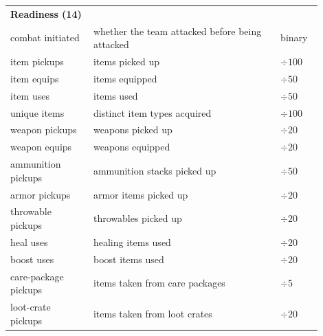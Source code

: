 \begin{table}[t]
\begin{tabular}{p{0.24\linewidth}p{0.54\linewidth}p{0.12\linewidth}}
\midrule
\multicolumn{3}{l}{\textbf{Readiness (14)}} \\
combat initiated & whether the team attacked before being attacked & binary \\
item pickups & items picked up & \(\div 100\) \\
item equips & items equipped & \(\div 50\) \\
item uses & items used & \(\div 50\) \\
unique items & distinct item types acquired & \(\div 100\) \\
weapon pickups & weapons picked up & \(\div 20\) \\
weapon equips & weapons equipped & \(\div 20\) \\
ammunition pickups & ammunition stacks picked up & \(\div 50\) \\
armor pickups & armor items picked up & \(\div 20\) \\
throwable pickups & throwables picked up & \(\div 20\) \\
heal uses & healing items used & \(\div 20\) \\
boost uses & boost items used & \(\div 20\) \\
care-package pickups & items taken from care packages & \(\div 5\) \\
loot-crate pickups & items taken from loot crates & \(\div 20\) \\
\bottomrule
\end{tabular}
\end{table}
